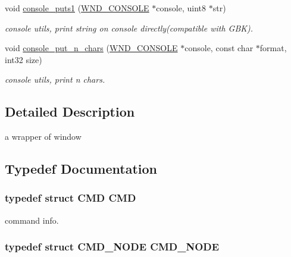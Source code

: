 \begin{DoxyCompactItemize}
void \hyperlink{group__console_ga92fd0ff29a72ec8cb00ddf0d44d65ebf}{console\+\_\+puts1} (\hyperlink{struct_w_n_d___c_o_n_s_o_l_e}{W\+N\+D\+\_\+\+C\+O\+N\+S\+O\+L\+E} $\ast$console, uint8 $\ast$str)
\begin{DoxyCompactList}\small\item\em console utils, print string on console directly(compatible with G\+B\+K). \end{DoxyCompactList}\item 
void \hyperlink{group__console_gad344cb1ed92edc1b1b3822bd261f5334}{console\+\_\+put\+\_\+n\+\_\+chars} (\hyperlink{struct_w_n_d___c_o_n_s_o_l_e}{W\+N\+D\+\_\+\+C\+O\+N\+S\+O\+L\+E} $\ast$console, const char $\ast$format, int32 size)
\begin{DoxyCompactList}\small\item\em console utils, print n chars. \end{DoxyCompactList}\end{DoxyCompactItemize}


\subsection{Detailed Description}
a wrapper of window 



\subsection{Typedef Documentation}
\hypertarget{group__console_ga9bdb805ff76fea569f65a522f969af43}{}
\subsubsection[{C\+M\+D}]{\setlength{\rightskip}{0pt plus 5cm}typedef struct {\bf C\+M\+D} {\bf C\+M\+D}}\label{group__console_ga9bdb805ff76fea569f65a522f969af43}


command info. 

\hypertarget{group__console_gabbfca59e8c7e8712bd8ed280f5c5de2b}{}
\subsubsection[{C\+M\+D\+\_\+\+N\+O\+D\+E}]{\setlength{\rightskip}{0pt plus 5cm}typedef struct {\bf C\+M\+D\+\_\+\+N\+O\+D\+E} {\bf C\+M\+D\+\_\+\+N\+O\+D\+E}}\label{group__console_gabbfca59e8c7e8712bd8ed280f5c5de2b}


